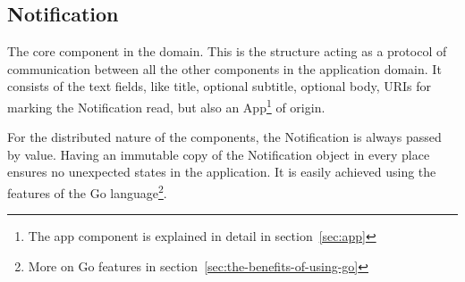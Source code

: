 \subsection{Notification}\label{sec:notification}

The core component in the domain.
This is the structure
acting as a protocol of communication
between all the other components
in the application domain.
It consists of the text fields,
like title, optional subtitle, optional body,
\acp{URI} for marking the Notification read,
but also an App\footnote{
  The app component is explained in detail in section~\ref{sec:app}
} of origin.

For the distributed nature of the components,
the Notification is always passed by value.
Having an immutable copy of the Notification object
in every place ensures
no unexpected states in the application.
It is easily achieved
using the features of
the Go language\footnote{
  More on Go features in section~\ref{sec:the-benefits-of-using-go}
}.
